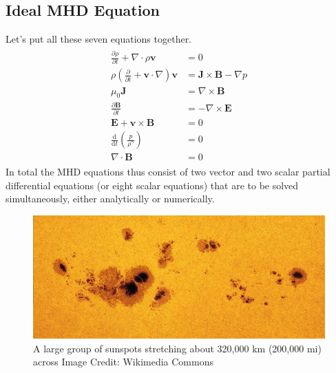 \documentclass[12pt]{article}
\newenvironment{changemargin}[2]{%
\begin{list}{}{%
\setlength{\topsep}{0pt}%
\setlength{\leftmargin}{#1}%
\setlength{\rightmargin}{#2}%
\setlength{\listparindent}{\parindent}%
\setlength{\itemindent}{\parindent}%
\setlength{\parsep}{\parskip}%
}%
\item[]}{\end{list}}
\begin{document}
\begin{changemargin}{-2cm}{-2cm}
    \subsection{Ideal MHD Equation}
    Let's put all these seven equations together.
    \begin{align}\label{eq:mhd}
        \begin{split}
            \frac{\partial \rho}{\partial t}  +\nabla \cdot \rho \mathbf{v}                            & = 0                                       \\
            \rho \left({\frac {\partial }{\partial t}}+\mathbf {v} \cdot \nabla \right)\mathbf {v} & =\mathbf {J} \times \mathbf {B} -\nabla p \\
            \mu _{0}\mathbf {J}                                                                    & =\nabla \times \mathbf {B}                \\
            {\frac {\partial \mathbf {B} }{\partial t}}                                            & =-\nabla \times \mathbf {E}               \\
            \mathbf {E} +\mathbf {v} \times \mathbf {B}                                            & =0                                        \\
            {\frac {\mathrm {d} }{\mathrm {d} t}}\left({\frac {p}{\rho ^{\gamma }}}\right)         & =0                                        \\
            \nabla \cdot \mathbf {B}                                                               & =0
        \end{split}
    \end{align}
    In total the MHD equations thus consist of two vector and two scalar partial differential equations (or eight scalar equations) that are to be solved simultaneously, either analytically or numerically.

    \begin{figure}[h]
        \includegraphics[width=1.0\textwidth, height=0.5\textwidth]{sunspot.jpg}
        \caption{A large group of sunspots stretching about 320,000 km (200,000 mi) across Image Credit: Wikimedia Commons}
        \label{fig:sunspot}
    \end{figure}

\end{changemargin}
\end{document}
